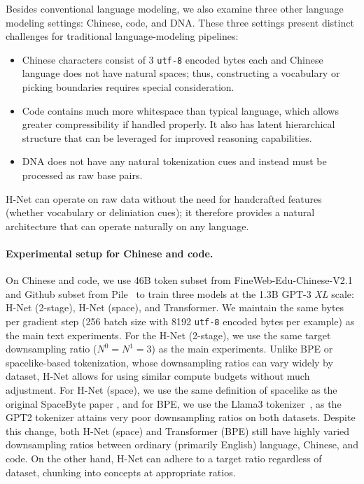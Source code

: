 \documentclass{article}
\newcommand{\citep}{\parencite}
\newcommand{\model}{H-Net}
\theoremstyle{plain}
\theoremstyle{remark}
\begin{document}
Besides conventional language modeling, we also examine three other language modeling settings: Chinese, code, and DNA. These three settings present distinct challenges for traditional language-modeling pipelines:
\begin{itemize}
    \item Chinese characters consist of 3 \texttt{utf-8} encoded bytes each and Chinese language does not have natural spaces; thus, constructing a vocabulary or picking boundaries requires special consideration.
    \item Code contains much more whitespace than typical language, which allows greater compressibility if handled properly. 
        It also has latent hierarchical structure that can be leveraged for improved reasoning capabilities.
    \item DNA does not have any natural tokenization cues and instead must be processed as raw base pairs. 
\end{itemize} 

\model{} can operate on raw data without the need for handcrafted features (whether vocabulary or deliniation cues); it therefore provides a natural architecture that can operate naturally on any language.

\paragraph{Experimental setup for Chinese and code.}
On Chinese and code, we use 46B token subset from FineWeb-Edu-Chinese-V2.1~\citep{OpenCSG} and Github subset from Pile~\citep{pile} to train three models at the 1.3B GPT-3 \textit{XL} scale: \model{} (2-stage), \model{} (space), and Transformer.
We maintain the same bytes per gradient step (256 batch size with 8192 \texttt{utf-8} encoded bytes per example) as the main text experiments. For the \model{} (2-stage), we use the same target downsampling ratio ($N^0=N^1=3$) as the main experiments. Unlike BPE or spacelike-based tokenization, whose downsampling ratios can vary widely by dataset, \model{} allows for using similar compute budgets without much adjustment. For \model{} (space), we use the same definition of spacelike as the original SpaceByte paper \citep{SpaceByte}, and for BPE, we use the Llama3 tokenizer~\citep{Llama3}, as the GPT2 tokenizer attains very poor downsampling ratios on both datasets. Despite this change, both \model{} (space) and Transformer (BPE) still have highly varied downsampling ratios between ordinary (primarily English) language, Chinese, and code. On the other hand, \model{} can adhere to a target ratio regardless of dataset, chunking into concepts at appropriate ratios.
\end{document}
